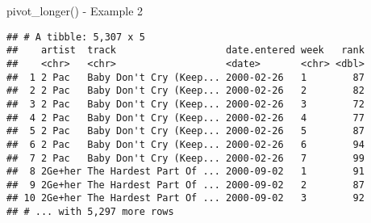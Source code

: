 \documentclass[
  ignorenonframetext,
]{beamer}
\newenvironment{Shaded}{\begin{snugshade}}{\end{snugshade}}
\newcommand{\DataTypeTok}[1]{\textcolor[rgb]{0.13,0.29,0.53}{#1}}
\newcommand{\KeywordTok}[1]{\textcolor[rgb]{0.13,0.29,0.53}{\textbf{#1}}}
\newcommand{\NormalTok}[1]{#1}
\newcommand{\OperatorTok}[1]{\textcolor[rgb]{0.81,0.36,0.00}{\textbf{#1}}}
\newcommand{\OtherTok}[1]{\textcolor[rgb]{0.56,0.35,0.01}{#1}}
\newcommand{\StringTok}[1]{\textcolor[rgb]{0.31,0.60,0.02}{#1}}
\begin{document}
\begin{frame}[fragile]{pivot\_longer() - Example 2}
\protect\hypertarget{pivot_longer---example-2-2}{}

\begin{Shaded}
\end{Shaded}

\begin{verbatim}
## # A tibble: 5,307 x 5
##    artist  track                   date.entered week   rank
##    <chr>   <chr>                   <date>       <chr> <dbl>
##  1 2 Pac   Baby Don't Cry (Keep... 2000-02-26   1        87
##  2 2 Pac   Baby Don't Cry (Keep... 2000-02-26   2        82
##  3 2 Pac   Baby Don't Cry (Keep... 2000-02-26   3        72
##  4 2 Pac   Baby Don't Cry (Keep... 2000-02-26   4        77
##  5 2 Pac   Baby Don't Cry (Keep... 2000-02-26   5        87
##  6 2 Pac   Baby Don't Cry (Keep... 2000-02-26   6        94
##  7 2 Pac   Baby Don't Cry (Keep... 2000-02-26   7        99
##  8 2Ge+her The Hardest Part Of ... 2000-09-02   1        91
##  9 2Ge+her The Hardest Part Of ... 2000-09-02   2        87
## 10 2Ge+her The Hardest Part Of ... 2000-09-02   3        92
## # ... with 5,297 more rows
\end{verbatim}

\end{frame}
\end{document}
